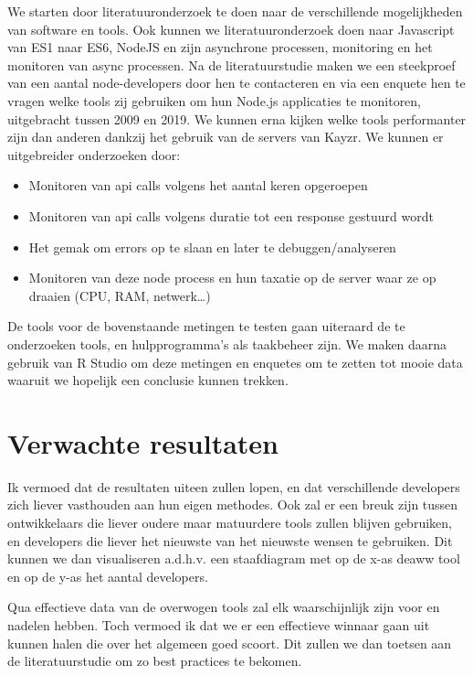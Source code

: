 We starten door literatuuronderzoek te doen naar de verschillende mogelijkheden van software en tools. Ook kunnen we literatuuronderzoek doen naar Javascript van ES1 naar ES6, NodeJS en zijn asynchrone processen, monitoring en het monitoren van async processen. Na de literatuurstudie maken we een steekproef van een aantal node-developers door hen te contacteren en via een enquete hen te vragen welke tools zij gebruiken om hun Node.js applicaties te monitoren, uitgebracht tussen 2009 en 2019. We kunnen erna kijken welke tools performanter zijn dan anderen dankzij het gebruik van de servers van Kayzr. We kunnen er uitgebreider onderzoeken door:

\begin{itemize}
	\item Monitoren van api calls volgens het aantal keren opgeroepen
	\item Monitoren van api calls volgens duratie tot een response gestuurd wordt
	\item Het gemak om errors op te slaan en later te debuggen/analyseren
	\item Monitoren van deze node process en hun taxatie op de server waar ze op draaien (CPU, RAM, netwerk…)
\end{itemize}

De tools voor de bovenstaande metingen te testen gaan uiteraard de te onderzoeken tools, en hulpprogramma's als taakbeheer zijn. We maken daarna gebruik van R Studio om deze metingen en enquetes om te zetten tot mooie data waaruit we hopelijk een conclusie kunnen trekken. 

\section{Verwachte resultaten}
\label{sec:verwachte_resultaten}

Ik vermoed dat de resultaten uiteen zullen lopen, en dat verschillende developers zich liever vasthouden aan hun eigen methodes. Ook zal er een breuk zijn tussen ontwikkelaars die liever oudere maar matuurdere tools zullen blijven gebruiken, en developers die liever het nieuwste van het nieuwste wensen te gebruiken. Dit kunnen we dan visualiseren a.d.h.v. een staafdiagram met op de x-as deaww tool en op de y-as het aantal developers.

Qua effectieve data van de overwogen tools zal elk waarschijnlijk zijn voor en nadelen hebben. Toch vermoed ik dat we er een effectieve winnaar gaan uit kunnen halen die over het algemeen goed scoort. Dit zullen we dan toetsen aan de literatuurstudie om zo best practices te bekomen.

